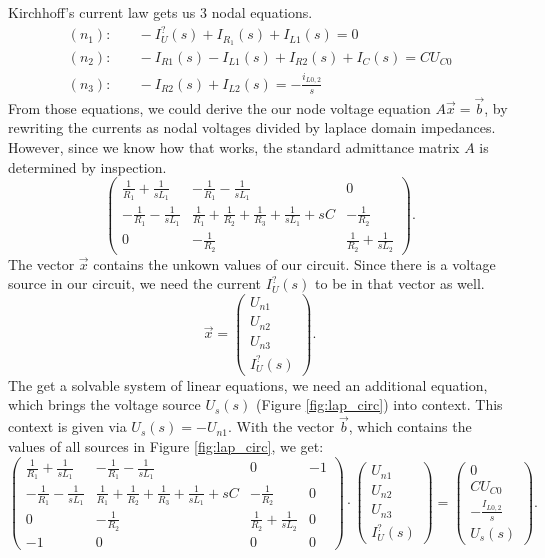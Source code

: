 \documentclass[a4paper]{article}
\begin{document}
 Kirchhoff's current law gets us $3$ nodal equations.
\begin{align*}
  (n_1):&\quad -I_{U}^{?}(s) + I_{R_1}(s) + I_{L1}(s) = 0 \\
  (n_2):&\quad-I_{R1}(s) - I_{L1}(s) +I_{R2}(s) + I_{C}(s) = CU_{C0} \\
  (n_3):&\quad -I_{R2}(s) + I_{L2}(s) = - \frac{i_{L0, 2}}{s}
\end{align*}
From those equations, we could derive the our node voltage equation $A\vec{x} = \vec{b}$, by 
rewriting the currents as nodal voltages divided by laplace domain impedances.
However, since we know how that works, the standard admittance matrix $A$ is determined by
inspection. 
\[
  \begin{pmatrix}
    \frac{1}{R_1} + \frac{1}{sL_1} & -\frac{1}{R_1} - \frac{1}{sL_1} & 0 \\
    -\frac{1}{R_1} - \frac{1}{sL_1} & \frac{1}{R_1} + \frac{1}{R_2} + \frac{1}{R_3} + 
    \frac{1}{sL_1} + sC & -\frac{1}{R_2} \\ 
    0 & -\frac{1}{R_2} & \frac{1}{R_2} + \frac{1}{sL_2}
  \end{pmatrix}
.\] 
The vector $\vec{x}$ contains the unkown values of our circuit. Since there is a voltage source in
our circuit, we need the current  $I_{U}^{?}(s)$ to be in that vector as well.
\[
  \vec{x} =
  \begin{pmatrix}
    U_{n1} \\ U_{n2} \\ U_{n3} \\ I_{U}^{?}(s) 
  \end{pmatrix}
.\] 
The get a solvable system of linear equations, we need an additional equation, which brings the
voltage source $U_s(s)$ (Figure \ref{fig:lap_circ}) into context. This context is given via 
$U_s(s) = -U_{n1}$. With the vector $\vec{b}$, which contains the values of all sources in Figure
\ref{fig:lap_circ}, we get:
\[
  \begin{pmatrix}
    \frac{1}{R_1} + \frac{1}{sL_1} & -\frac{1}{R_1} - \frac{1}{sL_1} & 0 & -1\\
    -\frac{1}{R_1} - \frac{1}{sL_1} & \frac{1}{R_1} + \frac{1}{R_2} + \frac{1}{R_3} + 
    \frac{1}{sL_1} + sC & -\frac{1}{R_2} & 0\\ 
    0 & -\frac{1}{R_2} & \frac{1}{R_2} + \frac{1}{sL_2} & 0 \\
    -1 & 0 & 0 & 0
  \end{pmatrix} \cdot
  \begin{pmatrix}
    U_{n1} \\ U_{n2} \\ U_{n3} \\ I_{U}^{?}(s)  
  \end{pmatrix} =
  \begin{pmatrix}
    0 \\ CU_{C0} \\ - \frac{I_{L0,2}}{s} \\ U_s(s)
  \end{pmatrix}
.\] \clearpage
\end{document}
